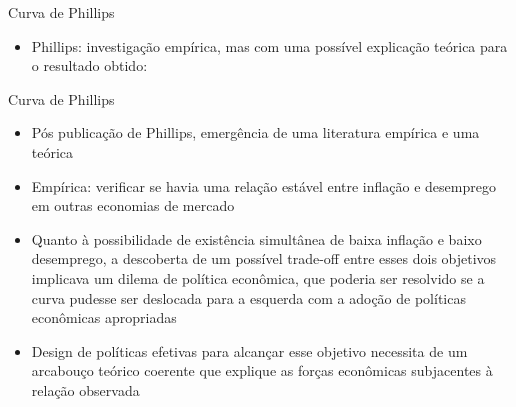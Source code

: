 \documentclass[10pt]{beamer}
\begin{document}
\begin{frame}{Curva de Phillips}
    \begin{itemize}
        \item Phillips: investigação empírica, mas com uma possível explicação teórica para o resultado obtido:\bigskip
    \end{itemize}
\end{frame}

\begin{frame}{Curva de Phillips}
    \begin{itemize}
        \item Pós publicação de Phillips, emergência de uma literatura empírica e uma teórica
        \bigskip
        \item Empírica: verificar se havia uma relação estável entre inflação e desemprego em outras economias de mercado
        \bigskip
        \item Quanto à possibilidade de existência simultânea de baixa inflação e baixo desemprego, a descoberta de um possível trade-off entre esses dois objetivos implicava um dilema de política econômica, que poderia ser resolvido se a curva pudesse ser deslocada para a esquerda com a adoção de políticas econômicas apropriadas
        \bigskip
        \item Design de políticas efetivas para alcançar esse objetivo necessita de um arcabouço teórico coerente que explique as forças econômicas subjacentes à relação observada
    \end{itemize}
\end{frame}
\end{document}
